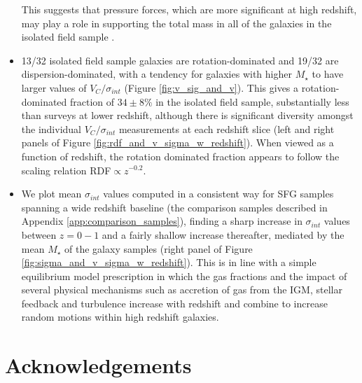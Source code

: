 \documentclass[fleqn,usenatbib]{mnras}
\begin{document}
\begin{itemize}
    This suggests that pressure forces, which are more significant at high redshift, may play a role in supporting the total mass in all of the galaxies in the isolated field sample \citep[e.g.][]{Burkert2010}.  
    \item 13/32 isolated field sample galaxies are rotation-dominated and 19/32 are dispersion-dominated, with a tendency for galaxies with higher $M_{\star}$ to have larger values of $V_{C}/\sigma_{int}$ (Figure \ref{fig:v_sig_and_v}).
    This gives a rotation-dominated fraction of $34 \pm 8 \%$ in the isolated field sample, substantially less than surveys at lower redshift, although there is significant diversity amongst the individual $V_{C}/\sigma_{int}$ measurements at each redshift slice (left and right panels of Figure \ref{fig:rdf_and_v_sigma_w_redshift}).
    When viewed as a function of redshift, the rotation dominated fraction appears to follow the scaling relation RDF$\propto z^{-0.2}$.
    \item We plot mean $\sigma_{int}$ values computed in a consistent way for SFG samples spanning a wide redshift baseline (the comparison samples described in Appendix \ref{app:comparison_samples}), finding a sharp increase in $\sigma_{int}$ values between $z=0-1$ and a fairly shallow increase thereafter, mediated by the mean $M_{\star}$ of the galaxy samples (right panel of Figure \ref{fig:sigma_and_v_sigma_w_redshift}).
    This is in line with a simple equilibrium model prescription in which the gas fractions and the impact of several physical mechanisms such as accretion of gas from the IGM, stellar feedback and turbulence increase with redshift and combine to increase random motions within high redshift galaxies.


\end{itemize}

\section*{Acknowledgements}
\end{document}
